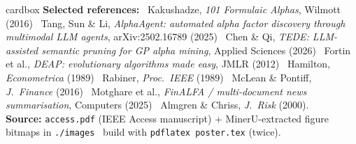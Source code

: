 \documentclass[final]{beamer}
\newcommand{\code}[1]{\texttt{#1}}
\begin{document}
\begin{frame}[t]{}
\vskip0.25cm
\begin{beamercolorbox}[wd=\textwidth,leftskip=0.8cm,rightskip=0.8cm,sep=0.30cm]{cardbox}
{\footnotesize
\textbf{Selected references:} \textbullet\ Kakushadze, \emph{101 Formulaic Alphas}, Wilmott (2016) \textbullet\ Tang, Sun \& Li, \emph{AlphaAgent: automated alpha factor discovery through multimodal LLM agents}, arXiv:2502.16789 (2025) \textbullet\ Chen \& Qi, \emph{TEDE: LLM-assisted semantic pruning for GP alpha mining}, Applied Sciences (2026) \textbullet\ Fortin et al., \emph{DEAP: evolutionary algorithms made easy}, JMLR (2012) \textbullet\ Hamilton, \emph{Econometrica} (1989) \textbullet\ Rabiner, \emph{Proc.\ IEEE} (1989) \textbullet\ McLean \& Pontiff, \emph{J.\ Finance} (2016) \textbullet\ Motghare et al., \emph{FinALFA / multi-document news summarisation}, Computers (2025) \textbullet\ Almgren \& Chriss, \emph{J.\ Risk} (2000).\\[0.1cm]
\textbf{Source:} \code{access.pdf} (IEEE Access manuscript) + MinerU-extracted figure bitmaps in \code{./images} \textbullet\ build with \code{pdflatex poster.tex} (twice).
}
\end{beamercolorbox}

\end{frame}
\end{document}
